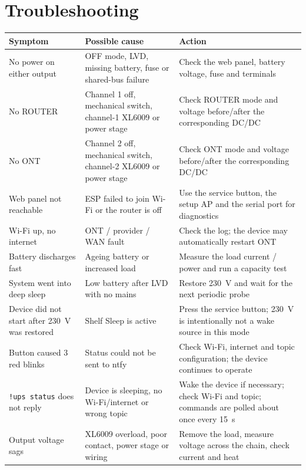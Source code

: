 \documentclass[11pt,a4paper]{article}
\begin{document}
\section{Troubleshooting}
\begin{longtable}{@{}p{38mm}p{48mm}p{74mm}@{}}
\toprule
\textbf{Symptom} & \textbf{Possible cause} & \textbf{Action} \\
\midrule
\endhead
No power on either output & OFF mode, LVD, missing battery, fuse or shared-bus failure & Check the web panel, battery voltage, fuse and terminals \\
No ROUTER & Channel 1 off, mechanical switch, channel-1 XL6009 or power stage & Check ROUTER mode and voltage before/after the corresponding DC/DC \\
No ONT & Channel 2 off, mechanical switch, channel-2 XL6009 or power stage & Check ONT mode and voltage before/after the corresponding DC/DC \\
Web panel not reachable & ESP failed to join Wi-Fi or the router is off & Use the service button, the setup AP and the serial port for diagnostics \\
Wi-Fi up, no internet & ONT / provider / WAN fault & Check the log; the device may automatically restart ONT \\
Battery discharges fast & Ageing battery or increased load & Measure the load current / power and run a capacity test \\
System went into deep sleep & Low battery after LVD with no mains & Restore 230~V and wait for the next periodic probe \\
Device did not start after 230~V was restored & Shelf Sleep is active & Press the service button; 230~V is intentionally not a wake source in this mode \\
Button caused 3 red blinks & Status could not be sent to ntfy & Check Wi-Fi, internet and topic configuration; the device continues to operate \\
\texttt{!ups status} does not reply & Device is sleeping, no Wi-Fi/internet or wrong topic & Wake the device if necessary; check Wi-Fi and topic; commands are polled about once every 15~s \\
Output voltage sags & XL6009 overload, poor contact, power stage or wiring & Remove the load, measure voltage across the chain, check current and heat \\
\bottomrule
\end{longtable}

\end{document}
